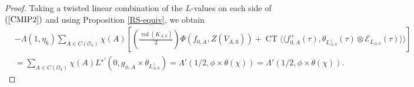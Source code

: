 \documentclass{amsart}
\theoremstyle{definition}
\theoremstyle{definition}
\theoremstyle{definition}
\begin{document}
\begin{proof}
Taking a twisted linear combination of the $L$-values on each side of $(\ref{CMIP2})$ and using Proposition \ref{RS-equiv}, we obtain 
\begin{equation} \begin{aligned}\label{CMIP3} 
&- \Lambda(1, \eta_k) \sum\limits_{A \in C(\mathcal{O}_k)} \chi(A) \left[ \left( \frac{ \operatorname{vol}(K_{A,0})  }{ 2} \right) \Phi(f_{0, A}, Z(V_{A, 0})) 
+ \operatorname{CT} \langle \langle f_{0, A}^+(\tau), \theta_{L_{A, 0}^{\perp}}(\tau) \otimes \mathcal{E}_{L_{A, 0}}(\tau) \rangle \rangle \right] \\
&= \sum\limits_{A \in C(\mathcal{O}_k)} \chi(A) L^{\star \prime}(0, g_{\phi, A} \times \theta_{L_{A, 0}^{\perp}})
= \Lambda'(1/2, \phi \times \theta(\chi)) = \Lambda'(1/2, \phi \times \theta(\chi)). \end{aligned}\end{equation}


\end{proof}
\end{document}
